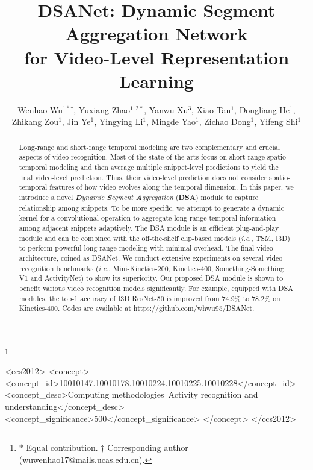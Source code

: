 \documentclass[sigconf]{acmart}
\begin{document}
\fancyhead{}
\title{DSANet: Dynamic Segment Aggregation Network \\ for Video-Level Representation Learning}

\thanks{$*$ Equal contribution. $\dag$ Corresponding author (wuwenhao17@mails.ucas.edu.cn).}

\author{
    Wenhao Wu$^{1*\dag}$,
    Yuxiang Zhao$^{1,2*}$,
    Yanwu Xu$^{3}$, 
    Xiao Tan$^{1}$,
    Dongliang He$^{1}$, \\
    Zhikang Zou$^{1}$,
    Jin Ye$^{1}$,
    Yingying Li$^{1}$,
    Mingde Yao$^{1}$,
    Zichao Dong$^{1}$,
    Yifeng Shi$^{1}$ 
}




\begin{abstract}
Long-range and short-range temporal modeling are two complementary and crucial aspects of video recognition. 
Most of the state-of-the-arts focus on short-range spatio-temporal modeling and then average multiple snippet-level predictions to yield the final video-level prediction. 
Thus, their video-level prediction does not consider spatio-temporal features of how video evolves along the temporal dimension.
In this paper, we introduce a novel \emph{\textbf{D}ynamic \textbf{S}egment \textbf{A}ggregation} (\textbf{DSA}) module to capture relationship among snippets.  
To be more specific, we attempt to generate a dynamic kernel for a convolutional operation to aggregate long-range temporal information among adjacent snippets adaptively. 
The DSA module is an efficient plug-and-play module and can be combined with the off-the-shelf clip-based models (\emph{i.e.,} TSM, I3D) to perform powerful long-range modeling with minimal overhead.
The final video architecture, coined as DSANet.
We conduct extensive experiments on several video recognition benchmarks (\emph{i.e.}, Mini-Kinetics-200, Kinetics-400, Something-Something V1 and ActivityNet) to show its superiority. 
Our proposed DSA module is shown to benefit various video recognition models significantly. For example, equipped with DSA modules, the top-1 accuracy of I3D ResNet-50 is improved from 74.9\% to 78.2\% on Kinetics-400.
Codes are available at \url{https://github.com/whwu95/DSANet}.
\end{abstract}

\begin{CCSXML}
<ccs2012>
   <concept>
       <concept_id>10010147.10010178.10010224.10010225.10010228</concept_id>
       <concept_desc>Computing methodologies~Activity recognition and understanding</concept_desc>
       <concept_significance>500</concept_significance>
       </concept>
 </ccs2012>
\end{CCSXML}
\end{document}
